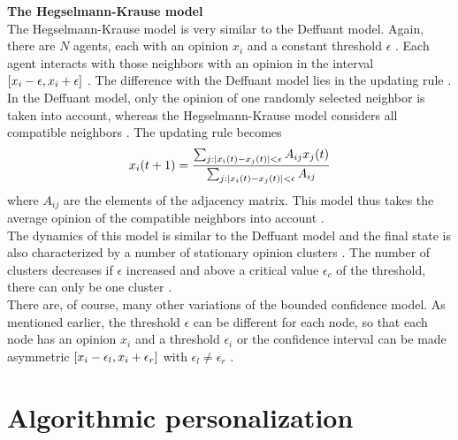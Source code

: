 \documentclass[11 pt , letterpaper , twoside , openright]{book}
\begin{document}
\newline
\textbf{The Hegselmann-Krause model}\\
\newline
The Hegselmann-Krause model is very similar to the Deffuant model. Again, there are $N$ agents, each with an opinion $x_i$ and a constant threshold $\epsilon$ \cite{Castellano2009}. Each agent interacts with those neighbors with an opinion in the interval $\interval{x_i-\epsilon}{x_i+\epsilon}$ \cite{Castellano2009}. The difference with the Deffuant model lies in the updating rule \cite{Castellano2009}. In the Deffuant model, only the opinion of one randomly selected neighbor is taken into account, whereas the Hegselmann-Krause model considers all compatible neighbors \cite{Castellano2009}. The updating rule becomes \cite{Castellano2009}
\begin{equation}
	x_i(t+1) = \frac{\sum_{j:\abs{x_i(t) - x_j(t)}<\epsilon}A_{ij}x_j(t)}{\sum_{j:\abs{x_i(t) - x_j(t)}<\epsilon}A_{ij}}
\end{equation}
where $A_{ij}$ are the elements of the adjacency matrix. This model thus takes the average opinion of the compatible neighbors into account \cite{Castellano2009}.\\
The dynamics of this model is similar to the Deffuant model and the final state is also characterized by a number of stationary opinion clusters \cite{Castellano2009}. The number of clusters decreases if $\epsilon$ increased and above a critical value $\epsilon_c$ of the threshold, there can only be one cluster \cite{Castellano2009}.\\
\newline
There are, of course, many other variations of the bounded confidence model. As mentioned earlier, the threshold $\epsilon$ can be different for each node, so that each node has an opinion $x_i$ and a threshold $\epsilon_i$ or the confidence interval can be made asymmetric $\interval{x_i - \epsilon_l}{x_i + \epsilon_r}$ with $\epsilon_l \neq
\epsilon_r$ \cite{Krause2002}.




\section{Algorithmic personalization}\label{filter}
\end{document}
